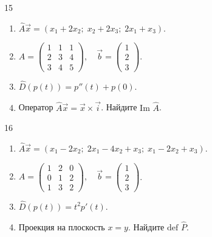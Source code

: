 \documentclass[12pt,a4paper]{article}
\theoremstyle{plain}
\theoremstyle{definition}
\begin{document}
\begin{taskbox}{15}
    \begin{enumerate}
        \item $\hat{A}\vec{x} = (x_1 + 2x_2; \; x_2 + 2x_3; \; 2x_1 + x_3)$.
        \item $A = \begin{pmatrix} 1 & 1 & 1 \\ 2 & 3 & 4 \\ 3 & 4 & 5 \end{pmatrix}, \quad \vec{b} = \begin{pmatrix} 1 \\ 2 \\ 3 \end{pmatrix}$.
        \item $\hat{D}(p(t)) = p''(t) + p(0)$.
        \item Оператор $\hat{A}\vec{x} = \vec{x} \times \vec{i}$. Найдите $\text{Im } \hat{A}$.
    \end{enumerate}
\end{taskbox}

\begin{taskbox}{16}
    \begin{enumerate}
        \item $\hat{A}\vec{x} = (x_1 - 2x_2; \; 2x_1 - 4x_2 + x_3; \; x_1 - 2x_2 + x_3)$.
        \item $A = \begin{pmatrix} 1 & 2 & 0 \\ 0 & 1 & 2 \\ 1 & 3 & 2 \end{pmatrix}, \quad \vec{b} = \begin{pmatrix} 1 \\ 2 \\ 3 \end{pmatrix}$.
        \item $\hat{D}(p(t)) = t^2 p'(t)$.
        \item Проекция на плоскость $x=y$. Найдите $\text{def } \hat{P}$.
    \end{enumerate}
\end{taskbox}
\end{document}
